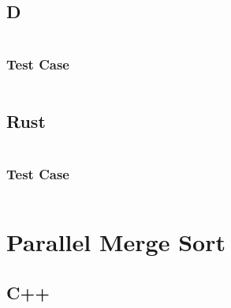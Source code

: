 \documentclass[finalcopy]{srpaper}
\begin{document}
\begin{mdframed}[linecolor=black]
\inputminted[fontsize=\scriptsize]{cpp}{../examples/generic-array-list/generic_array_list.cpp}
\end{mdframed}

\subsection{D}
\begin{mdframed}[linecolor=black]
\inputminted[fontsize=\scriptsize]{d}{../examples/generic-array-list/generic_array_list.d}
\end{mdframed}

\subsubsection{Test Case}
\begin{mdframed}[linecolor=black]
\inputminted[fontsize=\scriptsize]{d}{../examples/generic-array-list/tests/generic_array_list_test.d}
\end{mdframed}

\subsection{Rust}
\begin{mdframed}[linecolor=black]
\inputminted[fontsize=\scriptsize]{rust}{../examples/generic-array-list/generic_array_list.rs}
\end{mdframed}

\subsubsection{Test Case}
\begin{mdframed}[linecolor=black]
\inputminted[fontsize=\scriptsize]{rust}{../examples/generic-array-list/tests/generic-array-list-test.rs}
\end{mdframed}

\section{Parallel Merge Sort}
\subsection{C++}
\begin{mdframed}[linecolor=black]
\inputminted[fontsize=\scriptsize]{cpp}{../examples/parallel-merge-sort/parallel_merge_sort.cpp}
\end{mdframed}
\end{document}
